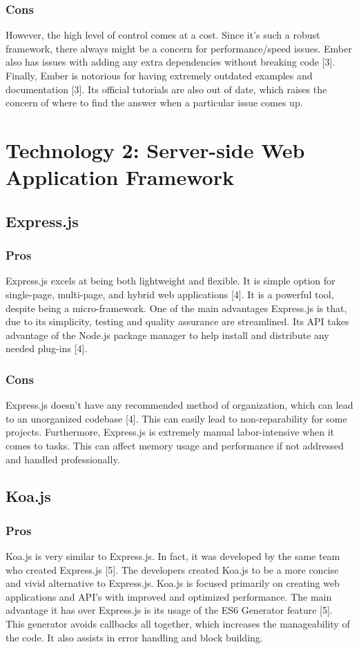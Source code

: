 \documentclass[onecolumn, draftclsnofoot,10pt, compsoc]{IEEEtran}
\begin{document}
    \subsubsection{Cons}
    However, the high level of control comes at a cost. Since it’s such a robust framework, there always might be a concern for performance/speed issues. Ember also has issues with adding any extra dependencies without breaking code [3]. Finally, Ember is notorious for having extremely outdated examples and documentation [3]. Its official tutorials are also out of date, which raises the concern of where to find the answer when a particular issue comes up.
		

\section{Technology 2: Server-side Web Application Framework}

	\subsection{Express.js}
	
		\subsubsection{Pros}
		Express.js excels at being both lightweight and flexible. It is simple option for single-page, multi-page, and hybrid web applications [4]. It is a powerful tool, despite being a micro-framework. One of the main advantages Express.js is that, due to its simplicity, testing and quality assurance are streamlined. Its API takes advantage of the Node.js package manager to help install and distribute any needed plug-ins [4].
    \subsubsection{Cons}
    Express.js doesn’t have any recommended method of organization, which can lead to an unorganized codebase [4]. This can easily lead to non-reparability for some projects. Furthermore, Express.js is extremely manual labor-intensive when it comes to tasks. This can affect memory usage and performance if not addressed and handled professionally.
	
	\subsection{Koa.js}
	
		\subsubsection{Pros}
		Koa.js is very similar to Express.js. In fact, it was developed by the same team who created Express.js [5]. The developers created Koa.js to be a more concise and vivid alternative to Express.js. Koa.js is focused primarily on creating web applications and API’s with improved and optimized performance. The main advantage it has over Express.js is its usage of the ES6 Generator feature [5]. This generator avoids callbacks all together, which increases the manageability of the code. It also assists in error handling and block building.
\end{document}
